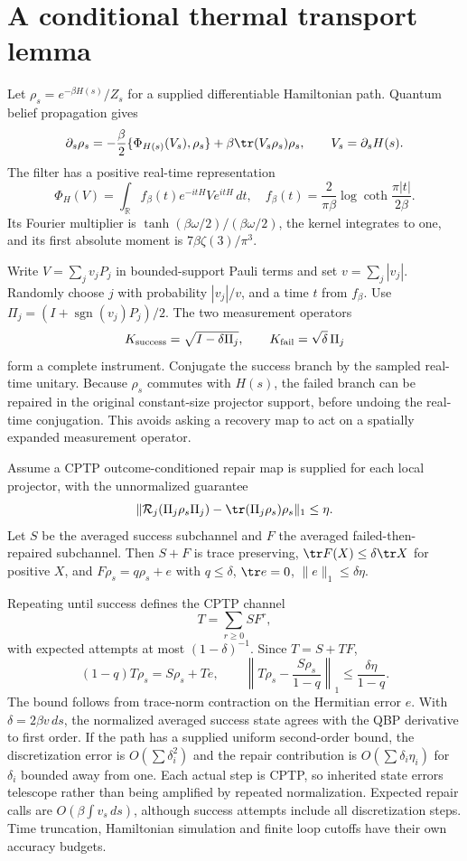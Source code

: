 \section*{A conditional thermal transport lemma}

Let $\rho_s=e^{-\beta H(s)}/Z_s$ for a supplied differentiable Hamiltonian path.
Quantum belief propagation gives
\[
 \partial_s\rho_s=-\frac\beta2\{\Phi_{H(s)}(V_s),\rho_s\}
 +\beta\tr(V_s\rho_s)\rho_s,\qquad V_s=\partial_sH(s).
\]
The filter has a positive real-time representation
\[
 \Phi_H(V)=\int_{\mathbb R}f_\beta(t)e^{-itH}Ve^{itH}\,dt,
 \quad f_\beta(t)=\frac{2}{\pi\beta}
 \log\coth\frac{\pi|t|}{2\beta}.
\]
Its Fourier multiplier is $\tanh(\beta\omega/2)/(\beta\omega/2)$,
the kernel integrates to one, and its first absolute moment is
$7\beta\zeta(3)/\pi^3$.

Write $V=\sum_jv_jP_j$ in bounded-support Pauli terms and set
$v=\sum_j|v_j|$. Randomly choose $j$ with probability $|v_j|/v$, and a time
$t$ from $f_\beta$. Use $\Pi_j=(I+\operatorname{sgn}(v_j)P_j)/2$.
The two measurement operators
\[
 K_{\rm success}=\sqrt{I-\delta\Pi_j},\qquad
 K_{\rm fail}=\sqrt\delta\,\Pi_j
\]
form a complete instrument. Conjugate the success branch by the sampled
real-time unitary. Because $\rho_s$ commutes with $H(s)$, the failed branch
can be repaired in the original constant-size projector support, before
undoing the real-time conjugation. This avoids asking a recovery map to act
on a spatially expanded measurement operator.

Assume a CPTP outcome-conditioned repair map is supplied for each local
projector, with the unnormalized guarantee
\[
 \|\mathcal R_j(\Pi_j\rho_s\Pi_j)
       -\tr(\Pi_j\rho_s)\rho_s\|_1\leq\eta.
\]
Let $S$ be the averaged success subchannel and $F$ the averaged failed-then-
repaired subchannel. Then $S+F$ is trace preserving, $\tr F(X)\leq\delta\tr X$
for positive $X$, and $F\rho_s=q\rho_s+e$ with $q\leq\delta$,
$\tr e=0$, $\|e\|_1\leq\delta\eta$.

Repeating until success defines the CPTP channel
\[
 T=\sum_{r\geq0}S F^r,
\]
with expected attempts at most $(1-\delta)^{-1}$. Since $T=S+TF$,
\[
 (1-q)T\rho_s=S\rho_s+Te,
 \qquad
 \left\|T\rho_s-\frac{S\rho_s}{1-q}\right\|_1
 \leq\frac{\delta\eta}{1-q}.
\]
The bound follows from trace-norm contraction on the Hermitian error $e$.
With $\delta=2\beta v\,ds$, the normalized averaged success state agrees
with the QBP derivative to first order. If the path has a supplied uniform
second-order bound, the discretization error is $O(\sum\delta_i^2)$ and
the repair contribution is $O(\sum\delta_i\eta_i)$ for $\delta_i$ bounded
away from one. Each actual step is CPTP, so inherited state errors telescope
rather than being amplified by repeated normalization. Expected repair calls
are $O(\beta\int v_s\,ds)$, although success attempts include all discretization
steps. Time truncation, Hamiltonian simulation and finite loop cutoffs have
their own accuracy budgets.

